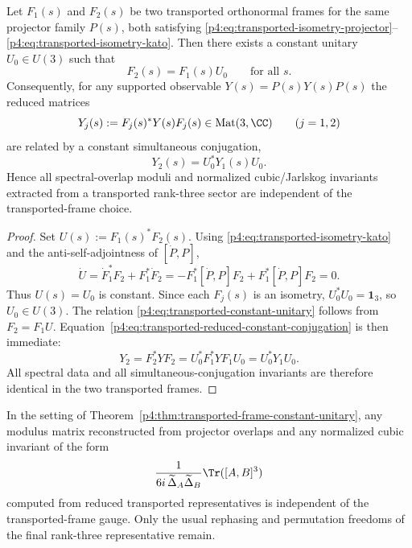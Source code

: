 \documentclass[12pt,a4paper]{article}
\begin{document}
\begin{theorem}
\label{p4:thm:transported-frame-constant-unitary}
Let $F_1(s)$ and $F_2(s)$ be two transported orthonormal frames for the same projector family $P(s)$, both satisfying \eqref{p4:eq:transported-isometry-projector}--\eqref{p4:eq:transported-isometry-kato}.
Then there exists a constant unitary $U_0\in U(3)$ such that
\begin{equation}
\label{p4:eq:transported-constant-unitary}
F_2(s)=F_1(s)U_0
\qquad\text{for all }s.
\end{equation}
Consequently, for any supported observable $Y(s)=P(s)Y(s)P(s)$ the reduced matrices
\begin{equation}
\label{p4:eq:transported-reduced-matrices-twoframes}
Y_j(s):=F_j(s)^*Y(s)F_j(s)\in\mathrm{Mat}(3,\CC)
\qquad (j=1,2)
\end{equation}
are related by a constant simultaneous conjugation,
\begin{equation}
\label{p4:eq:transported-reduced-constant-conjugation}
Y_2(s)=U_0^*Y_1(s)U_0.
\end{equation}
Hence all spectral-overlap moduli and normalized cubic/Jarlskog invariants extracted from a transported rank-three sector are independent of the transported-frame choice.
\end{theorem}

\begin{proof}
Set $U(s):=F_1(s)^*F_2(s)$.
Using \eqref{p4:eq:transported-isometry-kato} and the anti-self-adjointness of $[\dot P,P]$,
\[
\dot U
=
\dot F_1^*F_2+F_1^*\dot F_2
=
-F_1^*[\dot P,P]F_2+F_1^*[\dot P,P]F_2=0.
\]
Thus $U(s)=U_0$ is constant.
Since each $F_j(s)$ is an isometry, $U_0^*U_0=\mathbf 1_3$, so $U_0\in U(3)$.
The relation \eqref{p4:eq:transported-constant-unitary} follows from $F_2=F_1U$.
Equation~\eqref{p4:eq:transported-reduced-constant-conjugation} is then immediate:
\[
Y_2=F_2^*YF_2=U_0^*F_1^*YF_1U_0=U_0^*Y_1U_0.
\]
All spectral data and all simultaneous-conjugation invariants are therefore identical in the two transported frames.
\end{proof}

\begin{corollary}
\label{p4:cor:transport-gauge-invariance}
In the setting of Theorem~\ref{p4:thm:transported-frame-constant-unitary}, any modulus matrix reconstructed from projector overlaps and any normalized cubic invariant of the form
\[
\frac{1}{6i\,\widetilde\Delta_A\widetilde\Delta_B}\Tr([A,B]^3)
\]
computed from reduced transported representatives is independent of the transported-frame gauge.
Only the usual rephasing and permutation freedoms of the final rank-three representative remain.
\end{corollary}
\end{document}
